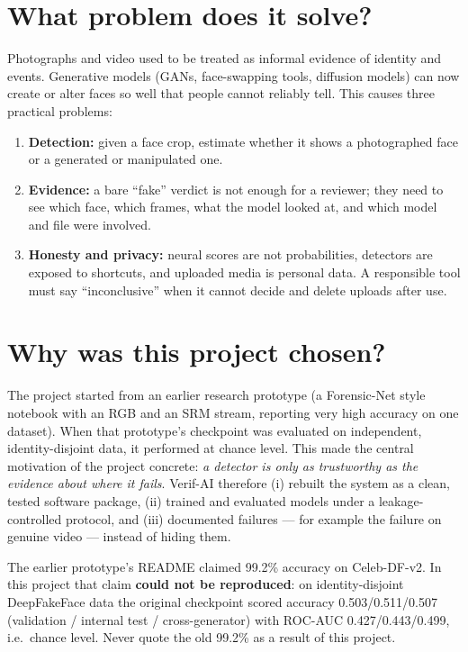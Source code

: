 \documentclass[11pt,a4paper]{report}
\begin{document}
\section{What problem does it solve?}
Photographs and video used to be treated as informal evidence of identity and events. Generative models (GANs, face-swapping tools, diffusion models) can now create or alter faces so well that
people cannot reliably tell. This causes three practical problems:
\begin{enumerate}
\item \textbf{Detection:} given a face crop, estimate whether it shows a photographed face or a generated or manipulated one.
\item \textbf{Evidence:} a bare ``fake'' verdict is not enough for a reviewer; they need to see which face, which frames, what the model looked at, and which model and file were involved.
\item \textbf{Honesty and privacy:} neural scores are not probabilities, detectors are exposed to shortcuts, and uploaded media is personal data. A responsible tool must say ``inconclusive'' when it cannot decide and delete uploads after use.
\end{enumerate}

\section{Why was this project chosen?}
The project started from an earlier research prototype (a Forensic-Net style notebook with an RGB and an SRM stream, reporting very high accuracy on one dataset). When that prototype's
checkpoint was evaluated on independent, identity-disjoint data, it performed at chance level. This made the central motivation of the project concrete:
\emph{a detector is only as trustworthy as the evidence about where it fails}. Verif-AI therefore (i) rebuilt the system as a clean, tested software package, (ii) trained and evaluated models under a
leakage-controlled protocol, and (iii) documented failures --- for example the failure on genuine video --- instead of hiding them.

\begin{warnbox}
The earlier prototype's README claimed 99.2\% accuracy on Celeb-DF-v2. In this project that claim \textbf{could not be reproduced}: on identity-disjoint DeepFakeFace data the original checkpoint scored accuracy
0.503/0.511/0.507 (validation / internal test / cross-generator) with ROC-AUC 0.427/0.443/0.499, i.e.\ chance level. Never quote the old 99.2\% as a result of this project.
\end{warnbox}
\end{document}
